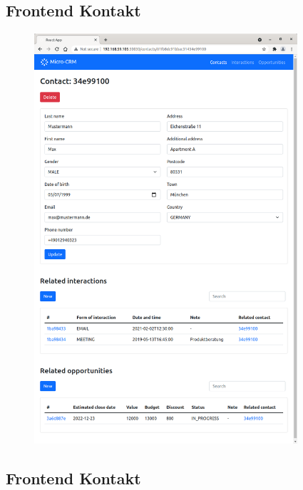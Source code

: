 \subsection*{Frontend Kontakt}

\begin{figure}[H] 
    \centering
    \includegraphics[width=0.87\textwidth]{figures/FrontendKontakt.png}
\end{figure}

\subsection*{Frontend Kontakt}


